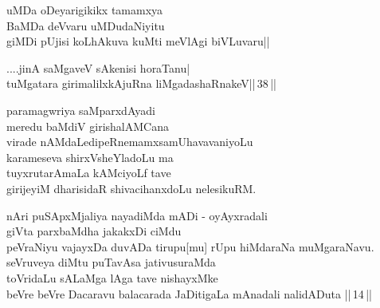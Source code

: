 \begin{entry}
\medskip

\begin{shl}
uMDa oDeyarigikikx tamamxya\\
BaMDa deVvaru uMDudaNiyitu\\
giMDi pUjisi koLhAkuva kuMti meVlAgi biVLuvaru||
\end{shl}
\smallskip
{}
\smallskip
{}
\end{entry}

\begin{entry}
\medskip

\begin{shl}
....jinA saMgaveV sAkenisi horaTanu|\\
tuMgatara girimalilxkAjuRna liMgadashaRnakeV||\,38\,||
\end{shl}
\smallskip
{}
\end{entry}

\begin{entry}
\medskip

\begin{shl}
paramagwriya saMparxdAyadi\\
meredu baMdiV girishalAMCana\\
virade nAMdaLedipeRnemamxsamUhavavaniyoLu\\
karameseva shirxVsheYladoLu ma\\
tuyxrutarAmaLa kAMciyoLf tave\\
girijeyiM dharisidaR shivacihanxdoLu nelesikuRM.
\end{shl}
\smallskip
{}
\end{entry}

\begin{entry}
\medskip

\begin{shl}
nAri puSApxMjaliya nayadiMda mADi - oyAyxradali\\ giVta parxbaMdha jakakxDi ciMdu\\
peVraNiyu vajayxDa duvADa tirupu[mu] rUpu hiMdaraNa muMgaraNavu.\\
seVruveya diMtu puTavAsa jativusuraMda\\ toVridaLu sALaMga lAga tave nishayxMke\\
beVre beVre Dacaravu balacarada JaDitigaLa mAnadali nalidADuta ||\,14\,|| 
\end{shl}
\smallskip
{}
\smallskip
{}
\end{entry}

